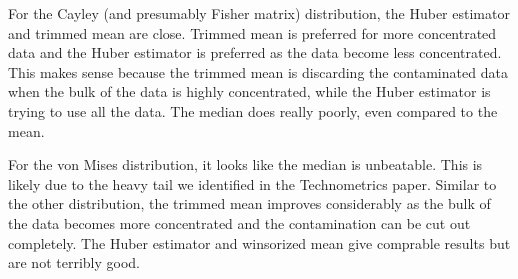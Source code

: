 \documentclass{article}\usepackage[]{graphicx}\usepackage[]{color}
\begin{document}
For the Cayley (and presumably Fisher matrix) distribution, the Huber estimator and trimmed mean are close.  Trimmed mean is preferred for more concentrated data and the Huber estimator is preferred as the data become less concentrated.  This makes sense because the trimmed mean is discarding the contaminated data when the bulk of the data is highly concentrated, while the Huber estimator is trying to use all the data.  The median does really poorly, even compared to the mean.

For the von Mises distribution, it looks like the median is unbeatable.  This is likely due to the heavy tail we identified in the Technometrics paper.  Similar to the other distribution, the trimmed mean improves considerably as the bulk of the data becomes more concentrated and the contamination can be cut out completely.  The Huber estimator and winsorized mean give comprable results but are not terribly good.
\clearpage
%

\end{document}
